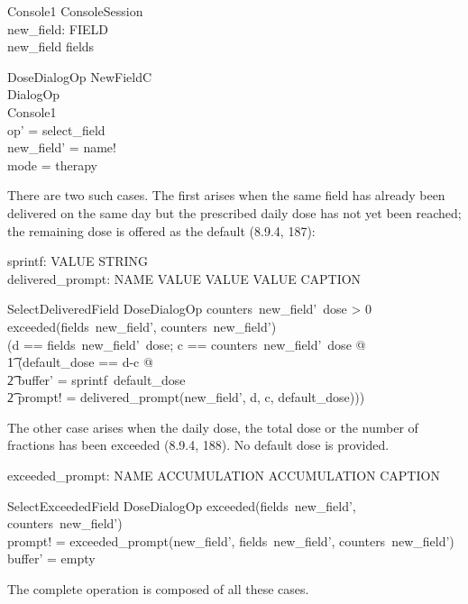 \documentclass{article}
\begin{document}
\begin{schema}{Console1}
	ConsoleSession \\
	new\_field: FIELD \\
\where
	new\_field \in \dom fields
\end{schema}

\begin{schema}{DoseDialogOp}
	NewFieldC \\
	DialogOp \\
	\Delta Console1 \\
\where
	op' = select\_field \\
	new\_field' = name! \\
	mode = therapy \\
\end{schema}
There are two such cases. The first arises when the same field has
already been delivered on the same day but the prescribed daily dose
has not yet been reached; the remaining dose is offered as the default
(8.9.4, 187):

\begin{axdef}
sprintf: VALUE \fun STRING \\
delivered\_prompt: NAME \cross VALUE \cross VALUE \cross VALUE \fun CAPTION \\
\end{axdef}

\begin{schema}{SelectDeliveredField}
	DoseDialogOp
\where
	counters~new\_field'~dose > 0 \\
	\lnot exceeded(fields~new\_field', counters~new\_field') \\
	(\LET d == fields~new\_field'~dose; c == counters~new\_field'~dose @ \\
\t1	 (\LET default\_dose == d-c @ \\
\t2	  buffer' = sprintf~default\_dose \land \\
\t2	   prompt! = delivered\_prompt(new\_field', d, c, default\_dose)))
\end{schema}
The other case arises when the daily dose, the total dose or the
number of fractions has been exceeded (8.9.4, 188).  No default dose
is provided.

\begin{axdef}
exceeded\_prompt: NAME \cross ACCUMULATION \cross ACCUMULATION \fun CAPTION
\end{axdef}

\begin{schema}{SelectExceededField}
	DoseDialogOp
\where
	exceeded(fields~new\_field', counters~new\_field') \\
	prompt! = exceeded\_prompt(new\_field', fields~new\_field', counters~new\_field') \\
	buffer' = empty \\
\end{schema}
The complete operation is composed of all these cases.
\end{document}
